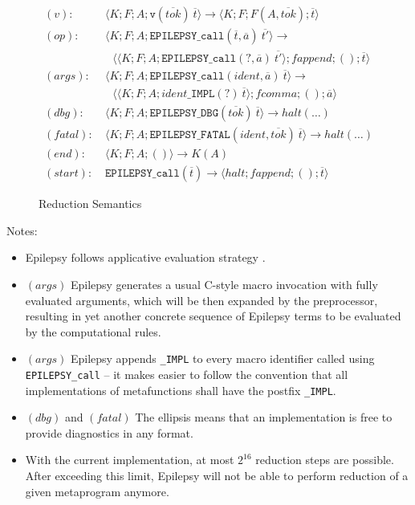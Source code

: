 \documentclass[12pt]{article}
\theoremstyle{break}
\begin{document}
\begin{figure}
    \caption{Reduction Semantics}

    \begin{align*}
        (v): & \ \langle K; F; A; \texttt{v}(\overline{tok}) \ \overline{t} \rangle \to
            \langle K; F; F(A, \overline{tok}); \overline{t} \rangle \\
        (op): & \ \langle K; F; A; \texttt{EPILEPSY\_call}(\overline{t}, \overline{a}) \ \overline{t'} \rangle \to \\
            & \ \ \ \ \langle \langle K; F; A; \texttt{EPILEPSY\_call}(?, \overline{a}) \ \overline{t'} \rangle; fappend; (); \overline{t} \rangle \\
        (args): & \ \langle K; F; A; \texttt{EPILEPSY\_call}(ident, \overline{a}) \ \overline{t} \rangle \to \\
            & \ \ \ \ \langle \langle K; F; A; ident\texttt{\_IMPL}(?) \ \overline{t} \rangle; fcomma; (); \overline{a} \rangle \\
        (dbg): & \ \langle K; F; A; \texttt{EPILEPSY\_DBG}(\overline{tok}) \ \overline{t} \rangle \to halt(\ldots) \\
        (fatal): & \ \langle K; F; A; \texttt{EPILEPSY\_FATAL}(ident, \overline{tok}) \ \overline{t} \rangle \to halt(\ldots) \\
        (end): & \ \langle K; F; A; () \rangle \to K(A) \\
        (start): & \ \texttt{EPILEPSY\_call}(\overline{t}) \to \langle halt; fappend; (); \overline{t} \rangle
    \end{align*}
    \label{ReductionSemantics}
\end{figure}

Notes:

\begin{itemize}
    \item Epilepsy follows applicative evaluation strategy \cite{ApplicativeEvaluationStrategy}.

    \item $(args)$ Epilepsy generates a usual C-style macro invocation with
    fully evaluated arguments, which will be then expanded by the preprocessor, resulting
    in yet another concrete sequence of Epilepsy terms to be evaluated by the computational
    rules.
    \item $(args)$ Epilepsy appends \texttt{\_IMPL} to every macro identifier called using
    \texttt{EPILEPSY\_call} -- it makes easier to follow the convention that all implementations
    of metafunctions shall have the postfix \texttt{\_IMPL}.
    \item $(dbg)$ and $(fatal)$ The ellipsis means that an implementation is free to provide
    diagnostics in any format.
    \item With the current implementation, at most $2^{16}$ reduction steps are
    possible. After exceeding this limit, Epilepsy will not be able to perform reduction
    of a given metaprogram anymore.
\end{itemize}
\end{document}
